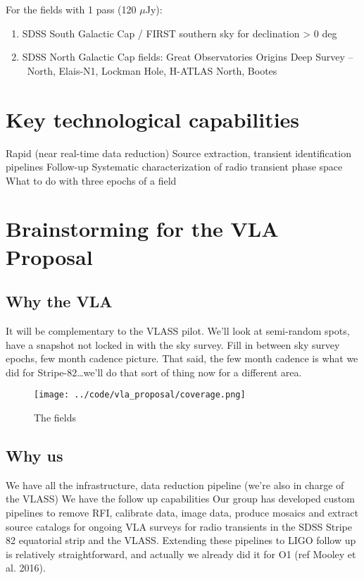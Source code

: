 \documentclass[12pt, letterpaper, preprint]{aastex}
\begin{document}
For the fields with 1 pass (120 $\mu$Jy):

\begin{enumerate}
  \item SDSS South Galactic Cap / FIRST southern sky for declination > 0 deg
  \item SDSS North Galactic Cap fields: Great Observatories Origins Deep Survey – North, Elais-N1, Lockman Hole, H-ATLAS North, Bootes
\end{enumerate}

\section{Key technological capabilities}

Rapid (near real-time data reduction)
Source extraction, transient identification pipelines
Follow-up
Systematic characterization of radio transient phase space
What to do with three epochs of a field 


\section{Brainstorming for the VLA Proposal}

\subsection{Why the VLA}

It will be complementary to the VLASS pilot.
We'll look at semi-random spots, have a snapshot not
locked in with the sky survey.
Fill in between sky survey epochs, few month
cadence picture. 
That said, the few month cadence is what we did for
Stripe-82\dots we'll do that sort of thing now for
a different area.

\begin{figure}[!p]
  \centering
  \texttt{[image: ../code/vla\_proposal/coverage.png]}
  \caption{The fields}
  \label{fig:coverage}
\end{figure}

\subsection{Why us}

We have all the infrastructure, 
data reduction pipeline (we’re also in charge of the VLASS)
We have the follow up capabilities
Our group has developed custom pipelines to remove RFI, 
calibrate data, image data, 
produce mosaics and extract source catalogs for ongoing 
VLA surveys for radio transients in the SDSS Stripe 82 
equatorial strip and the VLASS.
Extending these pipelines to LIGO follow up is
relatively straightforward, and actually we already
did it for O1 (ref Mooley et al. 2016). 
\end{document}
